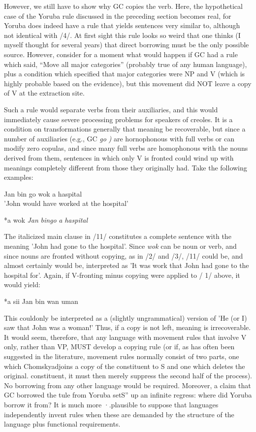 However, we still have to show why GC copies the verb. Here, the hypothetical case of the Yoruba rule discussed in the preceding section becomes real, for Yoruba does indeed have a rule that yields sentences very similar to, although not identical with /4/. At first sight this rule looks so weird that one thinks (I myself thought for several years) that direct borrowing must be the only possible source. However, consider for a moment what would happen if GC had a rule which said, ``Move all major categories'' (probably true of any human lan\-guage), plus a condition which specified that major categories were NP and V (which is highly probable based on the evidence), but this movement did NOT leave a copy of V at the extraction site.

Such a rule would separate verbs from their auxiliaries, and this would immediately cause severe processing problems for speakers of creoles. It is a condition on transformations generally that meaning be recoverable, but since a number of auxiliaries (e.g., GC \textit{go} \textit{)} are hornoph\-onous with full verbs or can modify zero copulas, and since many full verbs are homophonous with the nouns derived from them, sentences in which only V is fronted could wind up with meanings completely different from those they originally had. Take the following examples:


\ea\label{ex:10}
 Jan bin go wok a haspital\\
\glt  'John would have worked at the hospital'
\z



\ea\label{ex:11}
 *a wok \textit{Jan} \textit{bi}\textit{n}\textit{go} \textit{a} \textit{haspital}
\z

The italicized main clause in /11/ constitutes a complete sentence with the meaning 'John had gone to the hospital'. Since \textit{wok} can be noun or verb, and since nouns are fronted without copying, as in /2/ and
/3/, /11/ could be, and almost certainly would be, interpreted as 'It was work that John had gone to the hospital for'. Again, if V-fronting minus copying were applied to / 1/ above, it would yield:

\ea\label{ex:12}
 *a sii Jan bin wan uman
\z

This couldonly be interpreted as a (slightly ungrammatical) version of 'He (or I) saw that John was a woman!' Thus, if a copy is not left, meaning is irrecoverable. It would seem, therefore, that any language with movement rules that involve V only, rather than VP, MUST de\-velop a copying rule (or if, as has often been suggested in the literature, movement rules normally consist of two parts, one which Chomsky\-adjoins a copy of the constituent to S and one which deletes the original. constituent, it must then merely suppress the second half of the process). No borrowing from any other language would be required. Moreover, a claim that GC borrowed the tule from Yoruba setS'' up an infinite regress: where did Yoruba borrow it from? It is much more ·.plausible to suppose that languages independently invent rules when these are demanded by the structure of the language plus func\-tional requirements.

